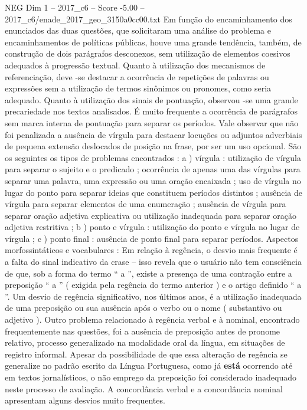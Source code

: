 \begin{textsample}{NEG Dim 1 – 2017\_c6 – Score -5.00 – 2017\_c6/enade\_2017\_geo\_3150a0cc00.txt}
Em função do encaminhamento dos enunciados das duas questões, que solicitaram uma análise do problema e encaminhamentos de políticas públicas, houve uma grande tendência, também, de construção de dois parágrafos desconexos, sem utilização de elementos coesivos adequados à progressão textual.
Quanto à utilização dos mecanismos de referenciação, deve -se destacar a ocorrência de repetições de palavras ou expressões sem a utilização de termos sinônimos ou pronomes, como seria adequado.
Quanto à utilização dos sinais de pontuação, observou -se uma grande precariedade nos textos analisados.
É muito frequente a ocorrência de parágrafos sem marca interna de pontuação para separar os períodos.
Vale observar que não foi penalizada a ausência de vírgula para destacar locuções ou adjuntos adverbiais de pequena extensão deslocados de posição na frase, por ser um uso opcional.
São os seguintes os tipos de problemas encontrados : a ) vírgula : utilização de vírgula para separar o sujeito e o predicado ; ocorrência de apenas uma das vírgulas para separar uma palavra, uma expressão ou uma oração encaixada ; uso de vírgula no lugar do ponto para separar ideias que constituem períodos distintos ; ausência de vírgula para separar elementos de uma enumeração ; ausência de vírgula para separar oração adjetiva explicativa ou utilização inadequada para separar oração adjetiva restritiva ; b ) ponto e vírgula : utilização do ponto e vírgula no lugar de vírgula ; c ) ponto final : ausência de ponto final para separar períodos.
Aspectos morfossintáticos e vocabulares : Em relação à regência, o desvio mais frequente é a falta do sinal indicativo da crase – isso revela que o usuário não tem consciência de que, sob a forma do termo “ a ”, existe a presença de uma contração entre a preposição “ a ” ( exigida pela regência do termo anterior ) e o artigo definido “ a ”.
Um desvio de regência significativo, nos últimos anos, é a utilização inadequada de uma preposição ou sua ausência após o verbo ou o nome ( substantivo ou adjetivo ).
Outro problema relacionado à regência verbal e à nominal, encontrado frequentemente nas questões, foi a ausência de preposição antes de pronome relativo, processo generalizado na modalidade oral da língua, em situações de registro informal.
Apesar da possibilidade de que essa alteração de regência se generalize no padrão escrito da Língua Portuguesa, como já \textbf{está} ocorrendo até em textos jornalísticos, o não emprego da preposição foi considerado inadequado neste processo de avaliação.
A concordância verbal e a concordância nominal apresentam alguns desvios muito frequentes.

\end{textsample}
